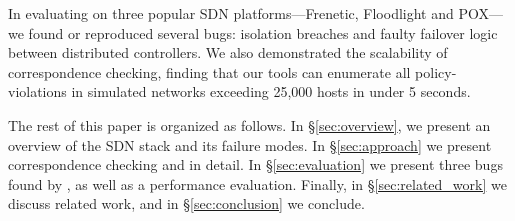 In evaluating \projectname{} on
three popular SDN platforms---Frenetic, Floodlight and POX---we found or reproduced several bugs:
isolation breaches and faulty failover logic between distributed controllers.
We also demonstrated the scalability of correspondence checking,
finding that our tools can enumerate all policy-violations in
simulated networks exceeding 25,000 hosts in under 5 seconds.

The rest of this paper is organized as follows. In \S\ref{sec:overview},
we present an overview of the SDN stack and its failure modes.
In \S\ref{sec:approach} we present correspondence checking and
\simulator{} in detail. In \S\ref{sec:evaluation} we present
three bugs found by \projectname{}, as well as a performance evaluation.
Finally, in \S\ref{sec:related_work} we discuss related work,
and in \S\ref{sec:conclusion} we conclude.


